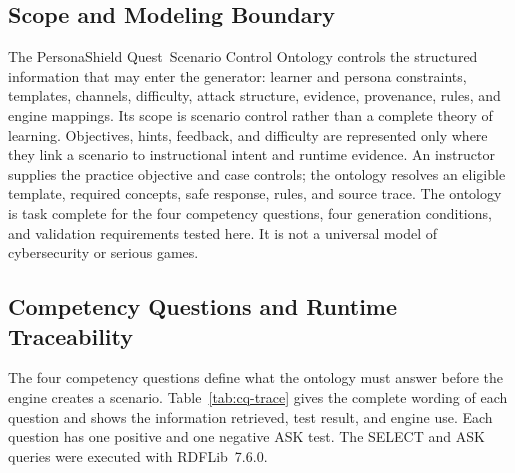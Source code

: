 \documentclass[runningheads]{llncs}
\newcommand{\psq}{PersonaShield Quest}
\begin{document}
\subsection{Scope and Modeling Boundary}

The \psq\ Scenario Control Ontology controls the structured information that may
enter the generator: learner and persona constraints, templates, channels,
difficulty, attack structure, evidence, provenance, rules, and engine mappings.
Its scope is scenario control rather than a complete theory of learning.
Objectives, hints, feedback, and difficulty are represented only where they link
a scenario to instructional intent and runtime evidence. An instructor supplies
the practice objective and case controls; the ontology resolves an eligible
template, required concepts, safe response, rules, and source trace. The ontology
is task complete for the four competency questions, four generation conditions,
and validation requirements tested here. It is not a universal model of
cybersecurity or serious games.

\subsection{Competency Questions and Runtime Traceability}

The four competency questions define what the ontology must answer before the
engine creates a scenario. Table~\ref{tab:cq-trace} gives the complete wording of
each question and shows the information retrieved, test result, and engine use. Each
question has one positive and one negative ASK test. The SELECT and ASK queries
were executed with RDFLib~7.6.0.
\end{document}

